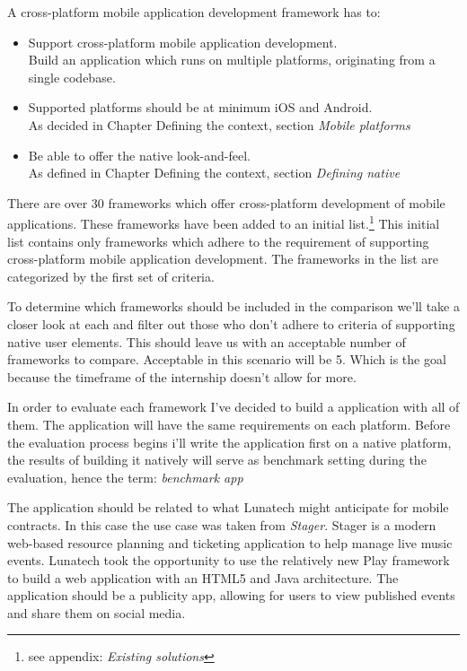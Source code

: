 
A cross-platform mobile application development framework has to:
\begin{itemize}
\item Support cross-platform mobile application development.\\
Build an application which runs on multiple platforms, originating from a single codebase.
\item Supported platforms should be at minimum iOS and Android.\\
As decided in Chapter Defining the context, section \emph{Mobile platforms}
\item Be able to offer the native look-and-feel.\\
As defined in Chapter Defining the context, section \emph{Defining native}
\end{itemize}



There are over 30 frameworks which offer cross-platform development of mobile applications\cite{Wikipedia2012}. These frameworks have been added to an initial list.\footnote{see appendix: \emph{Existing solutions}} This initial list contains only frameworks which adhere to the requirement of supporting cross-platform mobile application development. The frameworks in the list are categorized by the first set of criteria.

To determine which frameworks should be included in the comparison we'll take a closer look at each and filter out those who don't adhere to criteria of supporting native user elements. This should leave us with an acceptable number of frameworks to compare. Acceptable in this scenario will be 5. Which is the goal because the timeframe of the internship doesn't allow for more.


In order to evaluate each framework I've decided to build a application with all of them. The application will have the same requirements on each platform. Before the evaluation process begins i'll write the application first on a native platform, the results of building it natively will serve as benchmark setting during the evaluation, hence the term: \emph{benchmark app}

The application should be related to what Lunatech might anticipate for mobile contracts. In this case the use case was taken from \emph{Stager}. Stager is a modern web-based resource planning and ticketing application to help manage live music events. Lunatech took the opportunity to use the relatively new Play framework to build a web application with an HTML5 and Java architecture. The application should be a publicity app, allowing for users to view published events and share them on social media.

